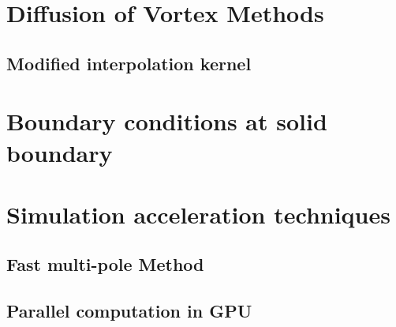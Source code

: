 \section{Diffusion of Vortex Methods}

	\subsection{Modified interpolation kernel}


\section{Boundary conditions at solid boundary}


\section{Simulation acceleration techniques}

\subsection{Fast multi-pole Method}

\subsection{Parallel computation in GPU}




%
%
%
%
